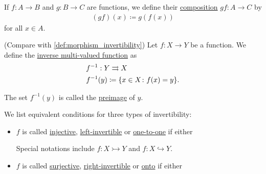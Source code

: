 \begin{definition}\label{def:function_composition}
  If $f: A \to B$ and $g: B \to C$ are functions, we define their \ul{composition} $gf: A \to C$ by
  \begin{align*}
    (gf)(x) \coloneqq g(f(x))
  \end{align*}
  for all $x \in A$.
\end{definition}

\begin{definition}\label{def:function_invertibility}(Compare with \cref{def:morphism_invertibility})
  Let $f: X \to Y$ be a function. We define the \ul{inverse multi-valued function} as
  \begin{align*}
    &f^{-1} : Y \rightrightarrows X \\
    &f^{-1}(y) \coloneqq \{ x \in X \colon f(x) = y \}.
  \end{align*}

  The set $f^{-1}(y)$ is called the \ul{preimage} of $y$.

  We list equivalent conditions for three types of invertibility:
  \begin{itemize}
    \item\label{def:function_invertibility/injection} $f$ is called \ul{injective}, \ul{left-invertible} or \ul{one-to-one} if either

    Special notations include $f: X \rightarrowtail Y$ and $f: X \hookrightarrow Y$.

    \item\label{def:function_invertibility/surjection} $f$ is called \ul{surjective}, \ul{right-invertible} or \ul{onto} if either


\end{itemize}
\end{definition}
